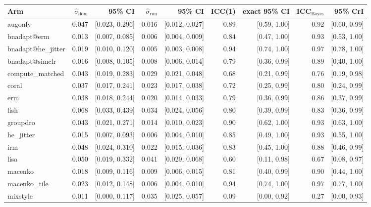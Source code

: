 \begin{tabular}{lrrrrrrrr}
\toprule
Arm & $\hat\sigma_\text{dom}$ & 95\% CI & $\hat\sigma_\text{run}$ & 95\% CI & ICC(1) & exact 95\% CI & ICC$_\text{Bayes}$ & 95\% CrI \\
\midrule
augonly & 0.047 & [0.023, 0.296] & 0.016 & [0.012, 0.027] & 0.89 & [0.59, 1.00] & 0.92 & [0.60, 0.99] \\
bnadapt@erm & 0.013 & [0.007, 0.085] & 0.006 & [0.004, 0.009] & 0.84 & [0.47, 1.00] & 0.93 & [0.53, 1.00] \\
bnadapt@he\_jitter & 0.019 & [0.010, 0.120] & 0.005 & [0.003, 0.008] & 0.94 & [0.74, 1.00] & 0.97 & [0.78, 1.00] \\
bnadapt@simclr & 0.016 & [0.008, 0.105] & 0.008 & [0.006, 0.014] & 0.79 & [0.36, 0.99] & 0.89 & [0.40, 1.00] \\
compute\_matched & 0.043 & [0.019, 0.283] & 0.029 & [0.021, 0.048] & 0.68 & [0.21, 0.99] & 0.76 & [0.19, 0.98] \\
coral & 0.037 & [0.017, 0.241] & 0.023 & [0.017, 0.038] & 0.72 & [0.25, 0.99] & 0.80 & [0.24, 0.99] \\
erm & 0.038 & [0.018, 0.244] & 0.020 & [0.014, 0.033] & 0.79 & [0.36, 0.99] & 0.86 & [0.37, 0.99] \\
fish & 0.068 & [0.033, 0.439] & 0.034 & [0.024, 0.056] & 0.80 & [0.39, 0.99] & 0.83 & [0.36, 0.99] \\
groupdro & 0.043 & [0.021, 0.271] & 0.014 & [0.010, 0.023] & 0.90 & [0.62, 1.00] & 0.93 & [0.63, 1.00] \\
he\_jitter & 0.015 & [0.007, 0.093] & 0.006 & [0.004, 0.010] & 0.85 & [0.49, 1.00] & 0.93 & [0.55, 1.00] \\
irm & 0.048 & [0.024, 0.310] & 0.022 & [0.015, 0.036] & 0.83 & [0.45, 1.00] & 0.88 & [0.46, 0.99] \\
lisa & 0.050 & [0.019, 0.332] & 0.041 & [0.029, 0.068] & 0.60 & [0.11, 0.98] & 0.67 & [0.08, 0.97] \\
macenko & 0.018 & [0.009, 0.116] & 0.009 & [0.006, 0.015] & 0.81 & [0.40, 0.99] & 0.90 & [0.44, 1.00] \\
macenko\_tile & 0.023 & [0.012, 0.148] & 0.006 & [0.004, 0.010] & 0.94 & [0.74, 1.00] & 0.97 & [0.77, 1.00] \\
mixstyle & 0.011 & [0.000, 0.117] & 0.035 & [0.025, 0.057] & 0.09 & [0.00, 0.92] & 0.27 & [0.00, 0.93] \\

\end{tabular}
